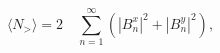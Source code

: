 \begin{equation}
 \langle N_> \rangle = 2\quad \sum^\infty _{n=1}
(\left| B^x_n \right| ^2 + \left| B^y_n \right| ^2 ), 
\end{equation} 
